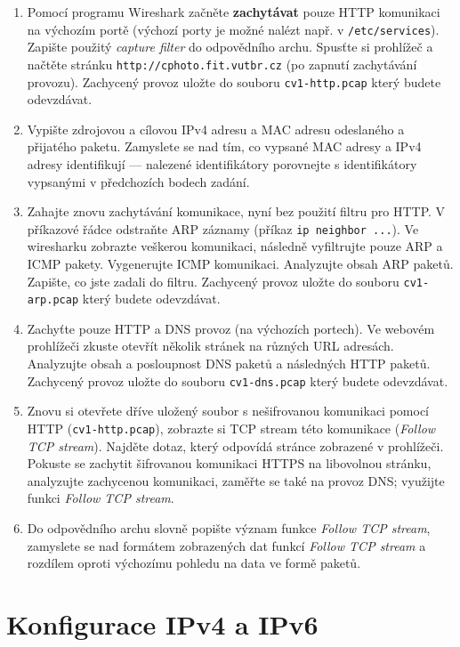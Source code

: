 \begin{enumerate}
  \item Pomocí programu Wireshark začněte \textbf{zachytávat} pouze HTTP komunikaci na výchozím portě (výchozí porty je možné nalézt např. v \texttt{/etc/services}).
    Zapište použitý \emph{capture filter} do odpovědního archu.
    Spusťte si prohlížeč a načtěte stránku \texttt{http://cphoto.fit.vutbr.cz} (po zapnutí zachytávání provozu).
    Zachycený provoz uložte do souboru \texttt{cv1-http.pcap} který budete odevzdávat.
\item Vypište zdrojovou a cílovou IPv4 adresu a MAC adresu odeslaného a přijatého paketu.
  Zamyslete se nad tím, co vypsané MAC adresy a IPv4 adresy identifikují --- nalezené identifikátory porovnejte s identifikátory vypsanými v předchozích bodech zadání.
\item Zahajte znovu zachytávání komunikace, nyní bez použití filtru pro HTTP.
  V příkazové řádce odstraňte ARP záznamy (příkaz \texttt{ip neighbor ...}).
  Ve wiresharku zobrazte veškerou komunikaci, následně vyfiltrujte pouze ARP a ICMP pakety.
  Vygenerujte ICMP komunikaci.
  Analyzujte obsah ARP paketů.
  Zapište, co jste zadali do filtru.
  Zachycený provoz uložte do souboru \texttt{cv1-arp.pcap} který budete odevzdávat.
\item Zachyťte pouze HTTP a DNS provoz (na výchozích portech).
  Ve webovém prohlížeči zkuste otevřít několik stránek na různých URL adresách.
  Analyzujte obsah a posloupnost DNS paketů a následných HTTP paketů.
  Zachycený provoz uložte do souboru \texttt{cv1-dns.pcap} který budete odevzdávat.
\item Znovu si otevřete dříve uložený soubor s nešifrovanou komunikaci pomocí HTTP (\texttt{cv1-http.pcap}), zobrazte si TCP stream této komunikace (\emph{Follow TCP stream}).
  Najděte dotaz, který odpovídá stránce zobrazené v prohlížeči.
  Pokuste se zachytit šifrovanou komunikaci HTTPS na libovolnou stránku, analyzujte zachycenou komunikaci, zaměřte se také na provoz DNS; využijte funkci \emph{Follow TCP stream}.
\item Do odpovědního archu slovně popište význam funkce \emph{Follow TCP stream}, zamyslete se nad formátem zobrazených dat funkcí \emph{Follow TCP stream} a rozdílem oproti výchozímu pohledu na data ve formě paketů.
\end{enumerate}

\section{Konfigurace IPv4 a IPv6}

